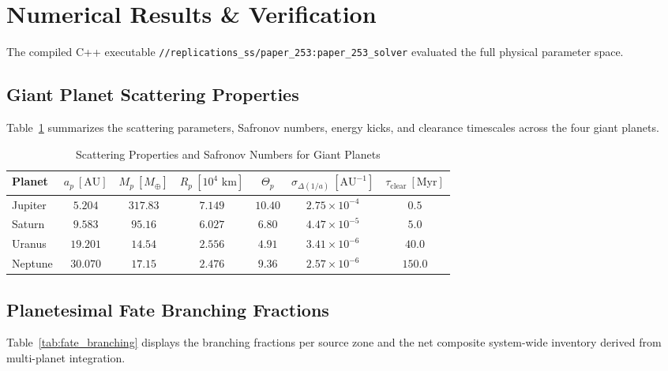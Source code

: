\documentclass[11pt,a4paper]{article}
\begin{document}
\section{Numerical Results \& Verification}
The compiled C++ executable \texttt{//replications\_ss/paper\_253:paper\_253\_solver} evaluated the full physical parameter space.

\subsection{Giant Planet Scattering Properties}
Table~\ref{tab:planet_scattering} summarizes the scattering parameters, Safronov numbers, energy kicks, and clearance timescales across the four giant planets.

\begin{table}[htbp]
\centering
\small
\caption{Scattering Properties and Safronov Numbers for Giant Planets}
\label{tab:planet_scattering}
\begin{tabular}{lcccccc}
\toprule
\textbf{Planet} & $a_p\ [\text{AU}]$ & $M_p\ [M_\oplus]$ & $R_p\ [10^4\text{ km}]$ & $\Theta_p$ & $\sigma_{\Delta(1/a)}\ [\text{AU}^{-1}]$ & $\tau_{\text{clear}}\ [\text{Myr}]$ \\
\midrule
Jupiter & $5.204$ & $317.83$ & $7.149$ & $10.40$ & $2.75 \times 10^{-4}$ & $0.5$ \\
Saturn  & $9.583$ & $95.16$  & $6.027$ & $6.80$  & $4.47 \times 10^{-5}$ & $5.0$ \\
Uranus  & $19.201$ & $14.54$ & $2.556$ & $4.91$  & $3.41 \times 10^{-6}$ & $40.0$ \\
Neptune & $30.070$ & $17.15$ & $2.476$ & $9.36$  & $2.57 \times 10^{-6}$ & $150.0$ \\
\bottomrule
\end{tabular}
\end{table}

\subsection{Planetesimal Fate Branching Fractions}
Table~\ref{tab:fate_branching} displays the branching fractions per source zone and the net composite system-wide inventory derived from multi-planet integration.
\end{document}
